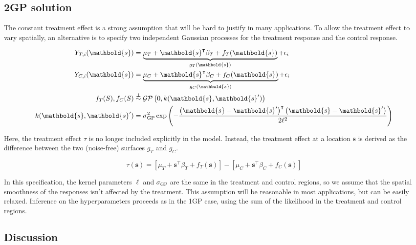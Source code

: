 \documentclass[letter]{article}
\newcommand{\genericdel}[3]{%
      \left#1#3\right#2
    }
\newcommand{\del}[1]{\genericdel(){#1}}
\newcommand{\sbr}[1]{\genericdel[]{#1}}
\newcommand{\gp}{\mathcal{GP}}
\newcommand{\trans}{^{\intercal}}
\newcommand{\sigmaf}{\sigma_{\mathrm{GP}}}
\newcommand{\svec}{\mathbold{s}}
\newcommand{\indep}{\protect\mathpalette{\protect\independenT}{\perp}}
\def\independenT#1#2{\mathrel{\rlap{$#1#2$}\mkern2mu{#1#2}}}
\begin{document}
    	\subsection{2GP solution}\label{gp-solution}

The constant treatment effect is a strong assumption that will be hard
to justify in many applications. To allow the treatment effect to vary
spatially, an alternative is to specify two independent Gaussian
processes for the treatment response and the control response.

\begin{equation}
\begin{split}
Y_{T,i}(\svec) &= \underbrace{\mu_T + \svec\trans\beta_T + f_T(\svec)}_{g_T(\svec)} + \epsilon_i \\
Y_{C,i}(\svec) &= \underbrace{\mu_C + \svec\trans\beta_C + f_C(\svec)}_{g_C(\svec)} + \epsilon_i \\
f_T(S), f_C(S) &\overset{\indep}{\sim} \gp\del{0, k(\svec, \svec')} \\
k(\svec,\svec') &= \sigmaf^2 \exp\del{ - \frac{\del{\svec-\svec'}\trans\del{\svec-\svec'}}{2 \ell^2}}
\end{split}
\label{eq:spec2gp}
\end{equation}

Here, the treatment effect \(\tau\) is no longer included explicitly in
the model. Instead, the treatment effect at a location \(\svec\) is
derived as the difference between the two (noise-free) surfaces \(g_T\)
and \(g_C\).

\begin{equation}
\tau(\svec) = \sbr{\mu_T + \svec\trans\beta_T + f_T(\svec)} - \sbr{\mu_C + \svec\trans\beta_C + f_C(\svec)}
\end{equation}

In this specification, the kernel parameters \(\ell\) and \(\sigmaf\)
are the same in the treatment and control regions, so we assume that the
spatial smoothness of the responses isn't affected by the treatment.
This assumption will be reasonable in most applications, but can be
easily relaxed. Inference on the hyperparameters proceeds as in the 1GP
case, using the sum of the likelihood in the treatment and control
regions.
    


    	\subsection{Discussion}\label{discussion}
\end{document}
